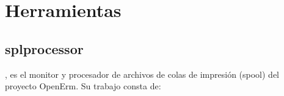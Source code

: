\documentclass[a4paper,12pt,spanish]{sphinxmanual}
\begin{document}
\chapter{Herramientas}
\label{\detokenize{index:herramientas}}\label{\detokenize{splprocessor:splprocessor}}\label{\detokenize{splprocessor:module-splprocessor}}\label{\detokenize{splprocessor:splprocessor}}

\section{splprocessor}
\label{\detokenize{splprocessor:id1}}\label{\detokenize{splprocessor::doc}}
, es el monitor y procesador de archivos de colas de impresión
(spool) del proyecto OpenErm. Su trabajo consta de:
\end{document}
